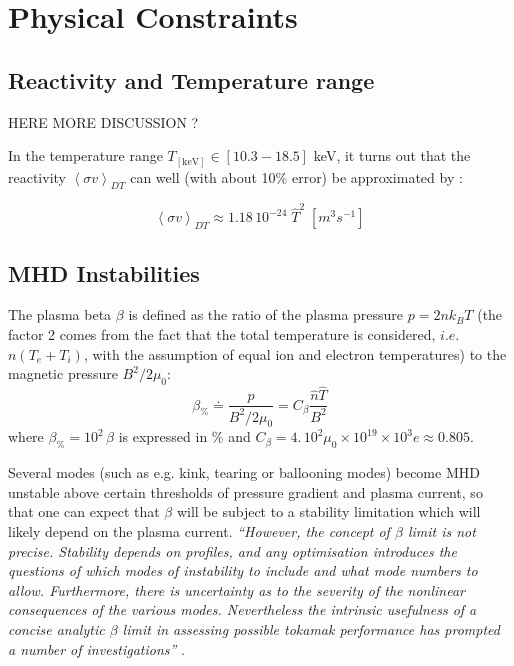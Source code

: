 \section{Physical Constraints}
\subsection{Reactivity and Temperature range}
HERE MORE DISCUSSION ?

In the temperature range $T_{\mathrm{[keV]}} \in [10.3-18.5]$ keV, it turns out that the reactivity $\left< \sigma v \right>_{DT}$ can well (with about 10$\%$ error) be approximated by \cite[(1.5.4)]{Wesson2004}: 

\begin{equation*}
\left< \sigma v \right>_{DT} \approx 1.18\, 10^{-24}\; \hat T^2 \;\si{\left[m^3 s^{-1}\right]}
\end{equation*}

\subsection{MHD Instabilities}
The plasma beta $\beta$ is defined as the ratio of the plasma pressure $p=2nk_BT$ (the factor 2 comes from the fact that the total temperature is considered, $i.e.$ $n(T_e+T_i)$, with the assumption of equal ion and electron temperatures) to the magnetic pressure $B^2/2\mu_0$:
\begin{equation}
\boxed{\beta_\% \doteq \frac{p}{B^2/2\mu_0}
	= C_\beta \frac{\hat n \hat T}{B^2}}
\label{eqn:beta}
\end{equation}
where $\beta_\%=10^2\, \beta$ is expressed in $\%$ and $C_\beta = 4.\,10^2\mu_0\times 10^{19}\times 10^3 e \approx 0.805$.

Several modes (such as e.g. kink, tearing or ballooning modes) become MHD unstable above certain thresholds of pressure gradient and plasma current, so that one can expect that $\beta$ will be subject to a stability limitation which will likely depend on the plasma current. \emph{``However, the concept of $\beta$ limit is not precise. Stability depends on profiles, and any optimisation introduces the questions of which modes of instability to include and what mode numbers to allow. Furthermore, there is uncertainty as to the severity of the nonlinear consequences of the various modes. Nevertheless the intrinsic usefulness of a concise analytic $\beta$ limit in assessing possible tokamak performance has prompted a number of investigations''} \cite{Wesson2004}.

